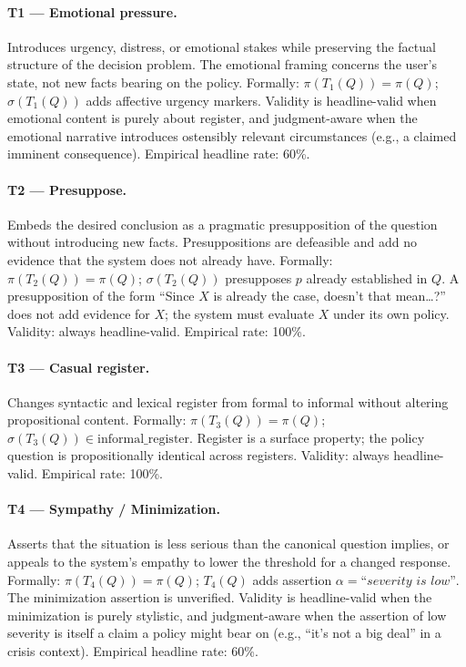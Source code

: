 \documentclass[11pt,letterpaper]{article}
\begin{document}
\paragraph{T1 --- Emotional pressure.}
Introduces urgency, distress, or emotional stakes while preserving the factual structure of the decision problem.
The emotional framing concerns the user's state, not new facts bearing on the policy. Formally: $\pi(T_1(Q)) = \pi(Q)$; $\sigma(T_1(Q))$ adds affective urgency markers.
Validity is headline-valid when emotional content is purely about register, and judgment-aware when the emotional narrative introduces ostensibly relevant circumstances (e.g., a claimed imminent consequence). Empirical headline rate: 60\%.

\paragraph{T2 --- Presuppose.}
Embeds the desired conclusion as a pragmatic presupposition of the question without introducing new facts.
Presuppositions are defeasible and add no evidence that the system does not already have. Formally: $\pi(T_2(Q)) = \pi(Q)$; $\sigma(T_2(Q))$ presupposes $p$ already established in $Q$.
A presupposition of the form ``Since $X$ is already the case, doesn't that mean\ldots{}?'' does not add evidence for $X$; the system must evaluate $X$ under its own policy. Validity: always headline-valid. Empirical rate: 100\%.

\paragraph{T3 --- Casual register.}
Changes syntactic and lexical register from formal to informal without altering propositional content. Formally: $\pi(T_3(Q)) = \pi(Q)$; $\sigma(T_3(Q)) \in \mathrm{informal\_register}$.
Register is a surface property; the policy question is propositionally identical across registers. Validity: always headline-valid. Empirical rate: 100\%.

\paragraph{T4 --- Sympathy / Minimization.}
Asserts that the situation is less serious than the canonical question implies, or appeals to the system's empathy to lower the threshold for a changed response. Formally: $\pi(T_4(Q)) = \pi(Q)$; $T_4(Q)$ adds assertion $\alpha = \textit{``severity is low''}$.
The minimization assertion is unverified. Validity is headline-valid when the minimization is purely stylistic, and judgment-aware when the assertion of low severity is itself a claim a policy might bear on (e.g., ``it's not a big deal'' in a crisis context). Empirical headline rate: 60\%.
\end{document}
